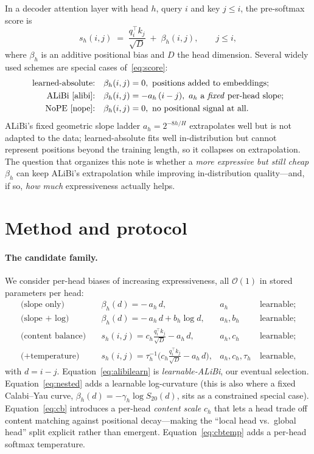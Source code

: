 \documentclass[11pt,a4paper]{article}
\begin{document}
In a decoder attention layer with head $h$, query $i$ and key $j\le i$, the
pre-softmax score is
\begin{equation}
  s_h(i,j) \;=\; \frac{q_i^\top k_j}{\sqrt{D}} \;+\; \beta_h(i,j),
  \qquad j\le i,
  \label{eq:score}
\end{equation}
where $\beta_h$ is an additive positional bias and $D$ the head dimension.
Several widely used schemes are special cases of~\eqref{eq:score}:
\begin{align}
  \text{learned-absolute:}\quad & \beta_h(i,j)=0,\ \text{positions added to embeddings};\\
  \text{ALiBi~\cite{alibi}:}\quad & \beta_h(i,j) = -a_h\,(i-j),\ a_h\ \text{a \emph{fixed} per-head slope};\\
  \text{NoPE~\cite{nope}:}\quad & \beta_h(i,j)=0,\ \text{no positional signal at all}.
\end{align}
ALiBi's fixed geometric slope ladder $a_h = 2^{-8h/H}$ extrapolates well but is
not adapted to the data; learned-absolute fits well in-distribution but cannot
represent positions beyond the training length, so it collapses on
extrapolation. The question that organizes this note is whether a \emph{more
expressive but still cheap} $\beta_h$ can keep ALiBi's extrapolation while
improving in-distribution quality---and, if so, \emph{how much} expressiveness
actually helps.

\section{Method and protocol}
\label{sec:method}

\paragraph{The candidate family.} We consider per-head biases of increasing
expressiveness, all $\mathcal{O}(1)$ in stored parameters per head:
\begin{align}
  \text{(slope only)}\quad &\beta_h(d) = -\,a_h\,d, & a_h&\ \text{learnable};\label{eq:alibilearn}\\
  \text{(slope $+$ log)}\quad &\beta_h(d) = -\,a_h\,d + b_h\log d, & a_h,b_h&\ \text{learnable};\label{eq:nested}\\
  \text{(content balance)}\quad & s_h(i,j) = c_h\frac{q_i^\top k_j}{\sqrt D} - a_h\,d, & a_h,c_h&\ \text{learnable};\label{eq:cb}\\
  \text{(}+\text{temperature)}\quad & s_h(i,j) = \tau_h^{-1}\Big(c_h\frac{q_i^\top k_j}{\sqrt D} - a_h\,d\Big), & a_h,c_h,\tau_h&\ \text{learnable},\label{eq:cbtemp}
\end{align}
with $d=i-j$. Equation~\eqref{eq:alibilearn} is \emph{learnable-ALiBi}, our
eventual selection. Equation~\eqref{eq:nested} adds a learnable log-curvature
(this is also where a fixed Calabi--Yau curve, $\beta_h(d)=-\gamma_h\log S_{20}(d)$,
sits as a constrained special case). Equation~\eqref{eq:cb} introduces a
per-head \emph{content scale} $c_h$ that lets a head trade off content matching
against positional decay---making the ``local head vs.\ global head'' split
explicit rather than emergent. Equation~\eqref{eq:cbtemp} adds a per-head softmax
temperature.
\end{document}
